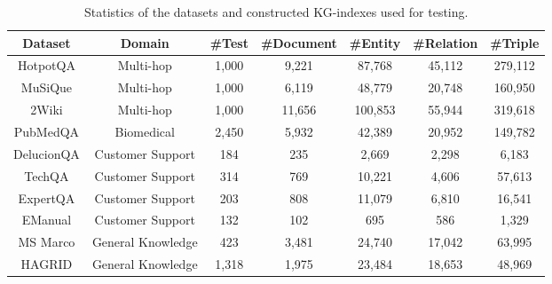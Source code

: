 \begin{table}[]
\centering
\caption{Statistics of the datasets and constructed KG-indexes used for testing.}
\label{tab:test_data}
\begin{tabular}{@{}ccccccc@{}}
\toprule
Dataset    & Domain            & \#Test & \#Document & \#Entity & \#Relation & \#Triple \\ \midrule
HotpotQA   & Multi-hop         & 1,000 & 9,221     & 87,768  & 45,112    & 279,112 \\
MuSiQue    & Multi-hop         & 1,000 & 6,119     & 48,779  & 20,748    & 160,950 \\
2Wiki      & Multi-hop         & 1,000 & 11,656    & 100,853 & 55,944    & 319,618 \\
PubMedQA   & Biomedical        & 2,450 & 5,932     & 42,389  & 20,952    & 149,782 \\
DelucionQA & Customer Support  & 184   & 235       & 2,669   & 2,298     & 6,183   \\
TechQA     & Customer Support  & 314   & 769       & 10,221  & 4,606     & 57,613  \\
ExpertQA   & Customer Support  & 203   & 808       & 11,079  & 6,810     & 16,541  \\
EManual    & Customer Support  & 132   & 102       & 695     & 586       & 1,329   \\
MS Marco   & General Knowledge & 423   & 3,481     & 24,740  & 17,042    & 63,995  \\
HAGRID     & General Knowledge & 1,318 & 1,975     & 23,484  & 18,653    & 48,969  \\ \bottomrule
\end{tabular}%
\end{table}